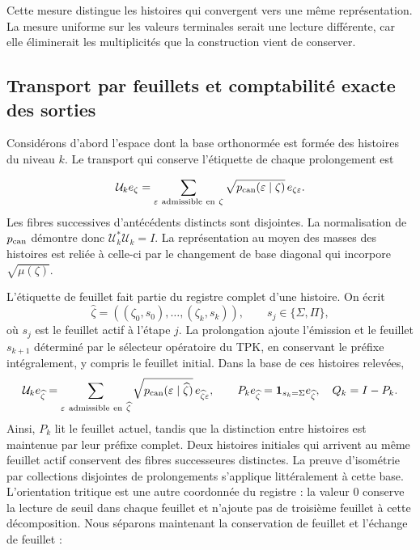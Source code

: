Cette mesure distingue les histoires qui convergent vers une même représentation. La mesure uniforme sur les valeurs terminales serait une lecture différente, car elle éliminerait les multiplicités que la construction vient de conserver.



\subsection{Transport par feuillets et comptabilité exacte des sorties}
Considérons d'abord l'espace dont la base orthonormée est formée des histoires du niveau \(k\). Le transport qui conserve l'étiquette de chaque prolongement est

\[
\mathcal U_ke_\zeta=
\sum_{\varepsilon\ \mathrm{admissible\ en}\ \zeta}
\sqrt{p_{\rm can}(\varepsilon\mid\zeta)}\,e_{\zeta\varepsilon}.
\]
Les fibres successives d'antécédents distincts sont disjointes. La normalisation de \(p_{\rm can}\) démontre donc \(\mathcal U_k^*\mathcal U_k=I\). La représentation au moyen des masses des histoires est reliée à celle-ci par le changement de base diagonal qui incorpore \(\sqrt{\mu(\zeta)}\).

L'étiquette de feuillet fait partie du registre complet d'une histoire. On écrit
\[
\widehat\zeta=((\zeta_0,s_0),\ldots,(\zeta_k,s_k)),\qquad
s_j\in\{\Sigma,\Pi\},
\]
où \(s_j\) est le feuillet actif à l'étape \(j\). La prolongation ajoute l'émission et le feuillet \(s_{k+1}\) déterminé par le sélecteur opératoire du TPK, en conservant le préfixe intégralement, y compris le feuillet initial. Dans la base de ces histoires relevées,
\[
\mathcal U_ke_{\widehat\zeta}
=\sum_{\varepsilon\ \mathrm{admissible\ en}\ \widehat\zeta}
\sqrt{p_{\rm can}(\varepsilon\mid\widehat\zeta)}\,e_{\widehat\zeta\varepsilon},
\qquad
P_ke_{\widehat\zeta}=\mathbf1_{s_k=\Sigma}e_{\widehat\zeta},\quad
Q_k=I-P_k.
\]
Ainsi, \(P_k\) lit le feuillet actuel, tandis que la distinction entre histoires est maintenue par leur préfixe complet. Deux histoires initiales qui arrivent au même feuillet actif conservent des fibres successeures distinctes. La preuve d’isométrie par collections disjointes de prolongements s’applique littéralement à cette base.
L’orientation tritique est une autre coordonnée du registre : la valeur \(0\) conserve la lecture de seuil dans chaque feuillet et n’ajoute pas de troisième feuillet à cette décomposition. Nous séparons maintenant la conservation de feuillet et l’échange de feuillet :


